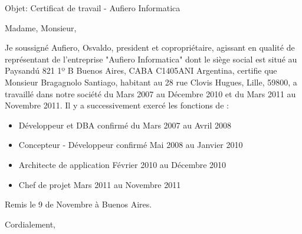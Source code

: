 \documentclass[11pt]{letter} %
\begin{document}

\begin{letter}{} 
\date{}%


\signature{Osvaldo Aufiero} %


Objet: Certificat de travail - Aufiero Informatica

\opening{Madame, Monsieur,} 

Je soussigné Aufiero, Osvaldo, president et copropriétaire, agissant en qualité de représentant de l'entreprise "Aufiero Informatica" dont le siège social est situé au Paysandú 821 1º B Buenos Aires, CABA C1405ANI Argentina, certifie que Monsieur Bragagnolo Santiago, habitant au 28 rue Clovis Hugues, Lille, 59800, a travaillé dans notre société du Mars 2007 au Décembre 2010 et du Mars 2011 au Novembre 2011. Il y a successivement exercé les fonctions de :
   \begin{itemize}
   	\item  Développeur et DBA confirmé du Mars 2007 au Avril 2008
	\item  Concepteur - Développeur confirmé  Mai 2008 au Janvier 2010
	\item  Architecte de application Février 2010 au Décembre 2010 
	\item  Chef de projet Mars 2011 au Novembre 2011
   \end{itemize}


Remis le 9 de Novembre à Buenos Aires. 


\closing{Cordialement,}




\end{letter}
\end{document}
